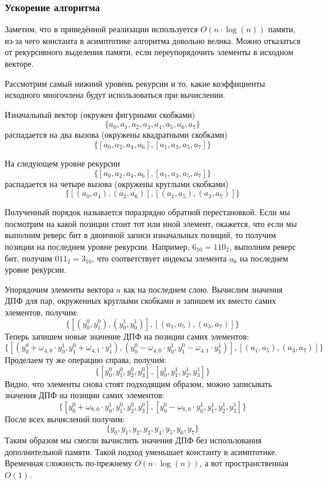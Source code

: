 \pagebreak

\subsubsection*{Ускорение алгоритма}
Заметим, что в приведённой реализации используется $O(n \cdot \log(n))$ памяти, из-за чего константа в асимптотике алгоритма довольно велика. Можно отказаться от рекурсивного выделения памяти, если переупорядочить элементы в исходном векторе.

Рассмотрим самый нижний уровень рекурсии и то, какие коэффициенты исходного многочлена будут использоваться при вычислении.

Изначальный вектор (окружен фигурными скобками)
$$ \{ a_0, a_1, a_2, a_3, a_4, a_5, a_6, a_7 \} $$
распадается на два вызова (окружены квадратными скобками)
$$\{ [ a_0, a_2, a_4, a_6 ], [ a_1, a_3, a_5, a_7 ] \}$$

На следующем уровне рекурсии
$$\{ [ a_0, a_2, a_4, a_6 ], [ a_1, a_3, a_5, a_7 ] \}$$
распадается на четыре вызова (окружены круглыми скобками)
$$\{ [ (a_0, a_4), (a_2, a_6) ], [(a_1, a_5), (a_3, a_7)] \}$$

Полученный порядок называется поразрядно обратной перестановкой. Если мы посмотрим на какой позиции стоит тот или иной элемент, окажется, что если мы выполним реверс бит в двоичной записи изначальных позиций, то получим позиции на последнем уровне рекурсии. Например, $6_{10} = {110}_{2}$, выполним реверс бит, получим ${011}_{2} = {3}_{10}$, что соответствует индексы элемента $a_6$ на последнем уровне рекурсии.

Упорядочим элементы вектора $a$ как на последнем слою. Вычислим значения ДПФ для пар, окруженных круглыми скобками и запишем их вместо самих элементов, получим:
$$\{ [ (y^0_0, y^0_1), (y^1_0, y^1_0) ], [(a_1, a_5), (a_3, a_7)] \}$$
Теперь запишем новые значение ДПФ на позиции самих элементов:
$$\{ [ (y^0_0 + {\omega_{4, 0} } \cdot y^1_0, y^0_1 + {\omega_{4, 1} } \cdot y^1_1), (y^0_0 - {\omega_{4, 0} } \cdot y^1_0, y^0_1 - {\omega_{4, 1} } \cdot y^1_1) ], [(a_1, a_5), (a_3, a_7)] \}$$
Проделаем ту же операцию справа, получим:
$$ \{ [ y^0_0, y^0_1, y^0_2, y^0_3 ], [ y^1_0, y^1_1, y^1_2, y^1_3 ] \} $$
Видно, что элементы снова стоят подходящим образом, можно записывать значения ДПФ на позиции самих элементов:
$$ \{ [ y^0_0 + {\omega_{8, 0} } \cdot y^1_0, y^0_1, y^0_2, y^0_3 ], [ y^0_0 - {\omega_{8, 0} } \cdot y^1_0, y^1_1, y^1_2, y^1_3 ] \} $$
После всех вычислений получим:
$$ \{ y_0, y_1, y_2, y_3, y_4, y_5, y_6, y_7 \} $$
Таким образом мы смогли вычислить значения ДПФ без использования дополнительной памяти. Такой подход уменьшает константу в асимптотике. Временная сложность по-прежнему $O(n \cdot \log(n))$, а вот пространственная $O(1)$.

